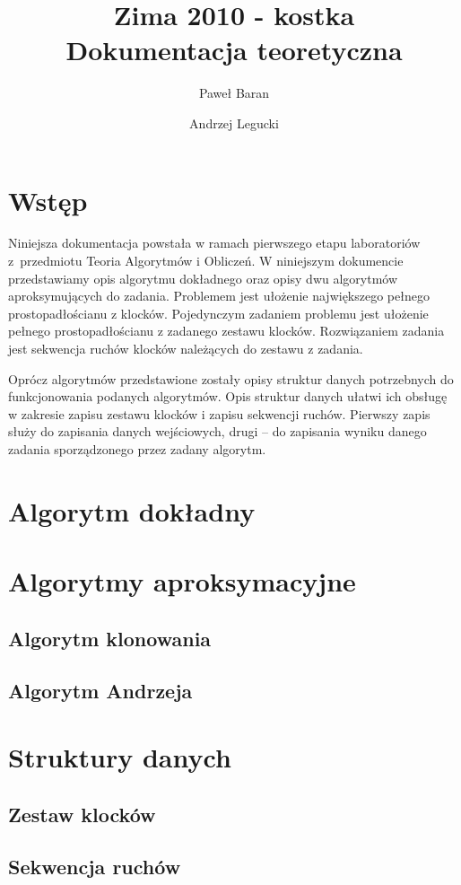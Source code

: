 \documentclass[12pt]{article}
\title{
\Huge{
Zima 2010 - kostka
} \\[0.5em]
\LARGE{
Dokumentacja teoretyczna
}
}
\author{
	Paweł Baran \and Andrzej Legucki
}
\begin{document}
\maketitle

\newpage

\tableofcontents

\newpage
\section{Wstęp}
Niniejsza dokumentacja powstała w ramach pierwszego etapu laboratoriów
z~przedmiotu Teoria Algorytmów i Obliczeń. W niniejszym dokumencie
przedstawiamy opis algorytmu dokładnego oraz opisy dwu algorytmów
aproksymujących do zadania. Problemem jest ułożenie największego
pełnego prostopadłościanu z klocków. Pojedynczym zadaniem problemu jest
ułożenie pełnego prostopadłościanu z zadanego zestawu klocków.
Rozwiązaniem zadania jest sekwencja ruchów klocków należących do zestawu
z zadania.

Oprócz algorytmów przedstawione zostały opisy struktur danych potrzebnych
do funkcjonowania podanych algorytmów. Opis struktur danych ułatwi ich
obsługę w zakresie zapisu zestawu klocków i zapisu sekwencji ruchów.
Pierwszy zapis służy do zapisania danych wejściowych, drugi -- do zapisania
wyniku danego zadania sporządzonego przez zadany algorytm.

\section{Algorytm dokładny}

\section{Algorytmy aproksymacyjne}

\subsection{Algorytm klonowania}

\subsection{Algorytm Andrzeja}

\section{Struktury danych}

\subsection{Zestaw klocków}

\subsection{Sekwencja ruchów}
\end{document}
